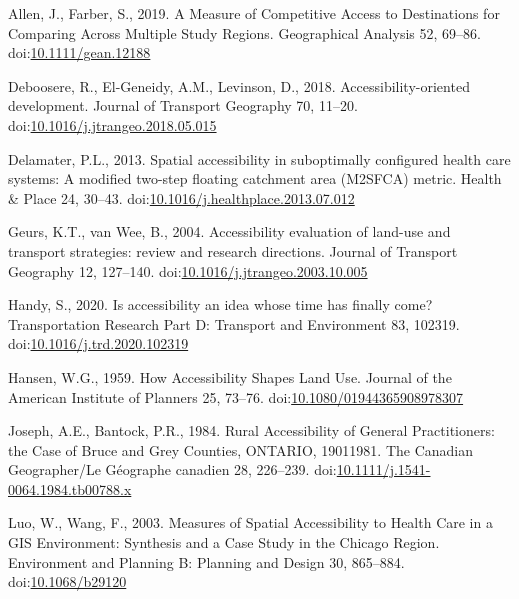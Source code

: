 \documentclass[]{elsarticle} %
\newlength{\cslhangindent}
\newenvironment{CSLReferences}[2] %
 {%
  \setlength{\parindent}{0pt}
  \ifodd #1 \everypar{\setlength{\hangindent}{\cslhangindent}}\ignorespaces\fi
  \ifnum #2 > 0
  \setlength{\parskip}{#2\baselineskip}
  \fi
 }%
 {}
\begin{document}
\hypertarget{refs}{}
\begin{CSLReferences}{1}{0}
\leavevmode{}%
Allen, J., Farber, S., 2019. A Measure of Competitive Access to
Destinations for Comparing Across Multiple Study Regions. Geographical
Analysis 52, 69--86.
doi:\href{https://doi.org/10.1111/gean.12188}{10.1111/gean.12188}

\leavevmode{}%
Deboosere, R., El-Geneidy, A.M., Levinson, D., 2018.
Accessibility-oriented development. Journal of Transport Geography 70,
11--20.
doi:\href{https://doi.org/10.1016/j.jtrangeo.2018.05.015}{10.1016/j.jtrangeo.2018.05.015}

\leavevmode{}%
Delamater, P.L., 2013. Spatial accessibility in suboptimally configured
health care systems: A modified two-step floating catchment area
(M2SFCA) metric. Health \& Place 24, 30--43.
doi:\href{https://doi.org/10.1016/j.healthplace.2013.07.012}{10.1016/j.healthplace.2013.07.012}

\leavevmode{}%
Geurs, K.T., van Wee, B., 2004. Accessibility evaluation of land-use and
transport strategies: review and research directions. Journal of
Transport Geography 12, 127--140.
doi:\href{https://doi.org/10.1016/j.jtrangeo.2003.10.005}{10.1016/j.jtrangeo.2003.10.005}

\leavevmode{}%
Handy, S., 2020. Is accessibility an idea whose time has finally come?
Transportation Research Part D: Transport and Environment 83, 102319.
doi:\href{https://doi.org/10.1016/j.trd.2020.102319}{10.1016/j.trd.2020.102319}

\leavevmode{}%
Hansen, W.G., 1959. How Accessibility Shapes Land Use. Journal of the
American Institute of Planners 25, 73--76.
doi:\href{https://doi.org/10.1080/01944365908978307}{10.1080/01944365908978307}

\leavevmode{}%
Joseph, A.E., Bantock, P.R., 1984. Rural Accessibility of General
Practitioners: the Case of Bruce and Grey Counties, ONTARIO,
1901{\textendash}1981. The Canadian Geographer/Le Géographe canadien 28,
226--239.
doi:\href{https://doi.org/10.1111/j.1541-0064.1984.tb00788.x}{10.1111/j.1541-0064.1984.tb00788.x}

\leavevmode{}%
Luo, W., Wang, F., 2003. Measures of Spatial Accessibility to Health
Care in a GIS Environment: Synthesis and a Case Study in the Chicago
Region. Environment and Planning B: Planning and Design 30, 865--884.
doi:\href{https://doi.org/10.1068/b29120}{10.1068/b29120}


\end{CSLReferences}
\end{document}
